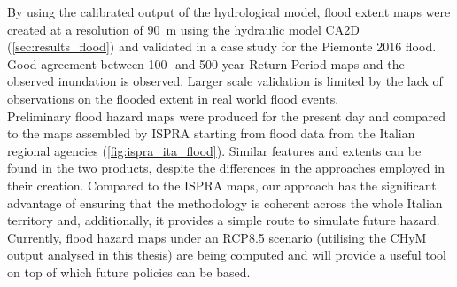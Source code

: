 By using the calibrated output of the hydrological model, flood extent maps were created at a resolution of \SI{90}{\meter} using the hydraulic model CA2D (\cref{sec:results_flood}) and validated in a case study for the Piemonte 2016 flood.
Good agreement between 100- and 500-year Return Period maps and the observed inundation is observed.
Larger scale validation is limited by the lack of observations on the flooded extent in real world flood events.\\
Preliminary flood hazard maps were produced for the present day and compared to the maps assembled by ISPRA starting from flood data from the Italian regional agencies (\cref{fig:ispra_ita_flood}).
Similar features and extents can be found in the two products, despite the differences in the approaches employed in their creation.
Compared to the ISPRA maps, our approach has the significant advantage of ensuring that the methodology is coherent across the whole Italian territory and, additionally, it provides a simple route to simulate future hazard.
Currently, flood hazard maps under an RCP8.5 scenario (utilising the CHyM output analysed in this thesis) are being computed and will provide a useful tool on top of which future policies can be based.


